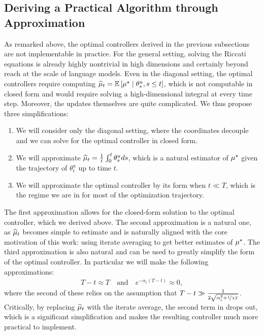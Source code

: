\subsection{Deriving a Practical Algorithm through Approximation}\label{app:practical_algorithm}

As remarked above, the optimal controllers derived in the previous subsections are not implementable in practice.  For the general setting, solving the Riccati equations is already highly nontrivial in high dimensions and certainly beyond reach at the scale of language models.  Even in the diagonal setting, the optimal controllers require computing $\widehat{\mu}_t = \mathbb{E}\left[ \mu^{\star} \mid \theta_s^u, s \leq t \right]$, which is not computable in closed form and would require solving a high-dimensional integral at every time step.  Moreover, the updates themselves are quite complicated.  We thus propose three simplifications:
\begin{enumerate}
    \item We will consider only the diagonal setting, where the coordinates decouple and we can solve for the optimal controller in closed form.
    \item We will approximate $\widehat{\mu}_t = \frac 1t \int_0^t \theta_s^u d s$, which is a natural estimator of $\mu^{\star}$ given the trajectory of $\theta_t^u$ up to time $t$.
    \item We will approximate the optimal controller by its form when $t \ll T$, which is the regime we are in for most of the optimization trajectory.
\end{enumerate}
The first approximation allows for the closed-form solution to the optimal controller, which we derived above.  The second approximation is a natural one, as $\widehat{\mu}_t$ becomes simple to estimate and is naturally aligned with the core motivation of this work: using iterate averaging to get better estimates of $\mu^{\star}$.  The third approximation is also natural and can be used to greatly simplify the form of the optimal controller.  In particular we will make the following approximations:
\begin{align}
    T -t \approx T \quad \text{and} \quad e^{- \alpha_i(T - t)} \approx 0,
\end{align}
where the second of these relies on the assumption that $T - t \gg \frac{1}{2 \sqrt{\alpha_i^2 + \nicefrac{1}{\lambda T}}}$.  Critically, by replacing $\widehat{\mu}_t$ with the iterate average, the second term in  drops out, which is a significant simplification and makes the resulting controller much more practical to implement.



